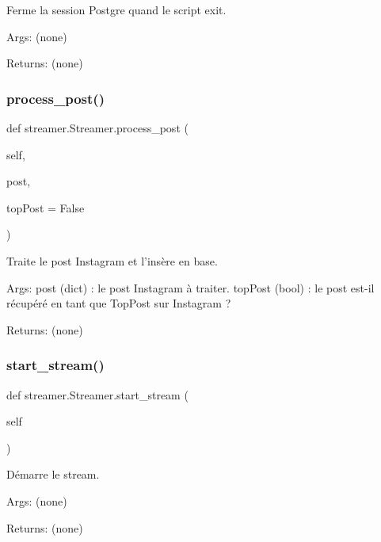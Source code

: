 \begin{DoxyVerb}Ferme la session Postgre quand le script exit.

Args:
    (none)

Returns:
    (none)
\end{DoxyVerb}
 \mbox{\label{classstreamer_1_1_streamer_adf219de2f5539f544a36ce625d3c265f}} 
\subsubsection{\texorpdfstring{process\+\_\+post()}{process\_post()}}
{\footnotesize\ttfamily def streamer.\+Streamer.\+process\+\_\+post (\begin{DoxyParamCaption}\item[{}]{self,  }\item[{}]{post,  }\item[{}]{top\+Post = {\ttfamily False} }\end{DoxyParamCaption})}

\begin{DoxyVerb}Traite le post Instagram et l'insère en base.

Args:
    post (dict) : le post Instagram à traiter.
    topPost (bool) : le post est-il récupéré en tant que TopPost sur Instagram ?

Returns:
    (none)
\end{DoxyVerb}
 \mbox{\label{classstreamer_1_1_streamer_a4fa871cd42320cd2df771d9844d1a67c}} 
\subsubsection{\texorpdfstring{start\+\_\+stream()}{start\_stream()}}
{\footnotesize\ttfamily def streamer.\+Streamer.\+start\+\_\+stream (\begin{DoxyParamCaption}\item[{}]{self }\end{DoxyParamCaption})}

\begin{DoxyVerb}Démarre le stream.

Args:
    (none)

Returns:
    (none)
\end{DoxyVerb}
 \mbox{\label{classstreamer_1_1_streamer_a17ac10d55adba12d6f2ba2bc842d0176}} 
